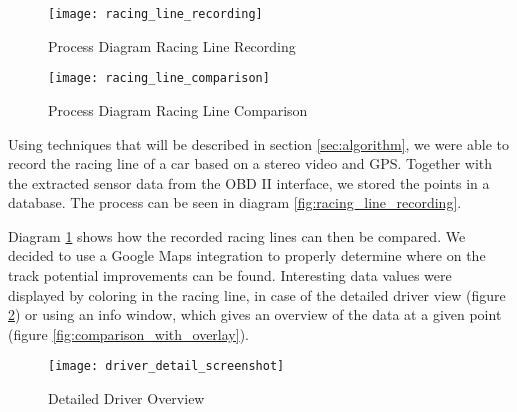 \begin{figure}[!ht]
	\begin{minipage}[b]{.45\textwidth}
		\centering
		\texttt{[image: racing\_line\_recording]}
		\caption{Process Diagram Racing Line Recording}
		\label{fig:racing_line_recording}
	\end{minipage}
	\hfill
	\begin{minipage}[b]{.45\textwidth}
		\centering
		\texttt{[image: racing\_line\_comparison]}
		\caption{Process Diagram Racing Line Comparison}
		\label{fig:racing_line_comparison}
	\end{minipage}
\end{figure}

Using techniques that will be described in section \ref{sec:algorithm}, we were able to record the racing line of a car based on a stereo video and GPS. Together with the extracted sensor data from the OBD II interface, we stored the points in a database. The process can be seen in diagram \ref{fig:racing_line_recording}.

Diagram \ref{fig:racing_line_comparison} shows how the recorded racing lines can then be compared. We decided to use a Google Maps integration to properly determine where on the track potential improvements can be found. Interesting data values were displayed by coloring in the racing line, in case of the detailed driver view (figure \ref{fig:driver_detail}) or using an info window, which gives an overview of the data at a given point (figure \ref{fig:comparison_with_overlay}).

\begin{figure}[!ht]
	\texttt{[image: driver\_detail\_screenshot]}
	\caption{Detailed Driver Overview}
	\label{fig:driver_detail}
\end{figure}

\clearpage
